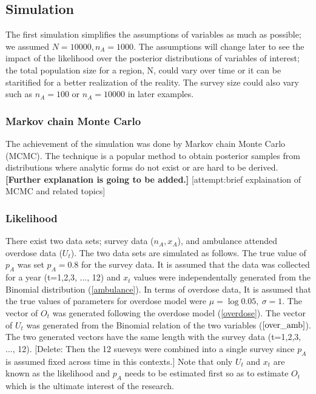 \documentclass[]{article}
\begin{document}
\subsection{Simulation}

\normalsize 
The first simulation simplifies the assumptions of variables as much as possible; we assumed $N= 10000, n_{A}=1000$. The assumptions will change later to see the impact of the likelihood over the posterior distributions of variables of interest; the total population size for a region, N, could vary over time or it can be staritified for a better realization of the reality. The survey size could also vary such as $n_{A}=100$ or $n_{A}=10000$ in later examples.  \\

\subsubsection{Markov chain Monte Carlo}
The achievement of the simulation was done by Markov chain Monte Carlo (MCMC). The technique is a popular method to obtain posterior samples from distributions where analytic forms do not exist or are hard to be derived. \textbf{[Further explanation is going to be added.]} [attempt:brief explaination of MCMC and related topics]\\


\subsubsection{Likelihood}

\normalsize 
There exist two data sets; survey data ($n_A, x_A$), and ambulance attended overdose data ($U_t$). The two data sets are simulated as follows. 
The true value of $p_A$ was set $p_A=0.8$ for the survey data.
It is assumed that the data was collected for a year (t=1,2,3, ..., 12) and 
$x_t$ values were independentally generated from the Binomial distribution (\ref{ambulance}).  In terms of overdose data, It is assumed that the true values of parameters for overdose model were $\mu=\log0.05,\ \sigma=1$.
The vector of $O_t$ was generated following the overdose model (\ref{overdose}). The vector of $U_t$ was generated from the Binomial relation of the two variables ($\ref{over_amb}$). The two generated vectors have the same length with the survey data (t=1,2,3, ..., 12). [Delete: Then the 12 sueveys were combined into a single survey since $p_A$ is assumed fixed across time in this contexts.] Note that only $U_t$ and $x_t$ are known as the likelihood and $p_A$ needs to be estimated first so as to estimate $O_t$ which is the ultimate interest of the research.\\
\end{document}
